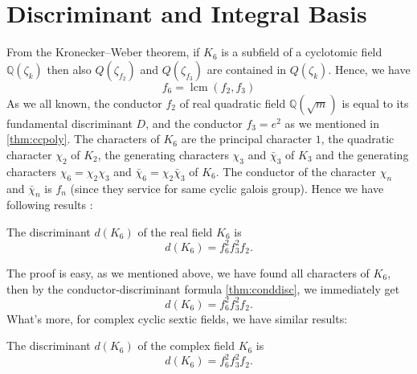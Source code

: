 \section{Discriminant and Integral Basis}
From the Kronecker–Weber theorem, if $K_6$ is a subfield of a cyclotomic field $\mathbb{Q}(\zeta_k)$ then also $Q(\zeta_{f_2})$ and $Q(\zeta_{f_3})$ are contained in $Q(\zeta_{k})$. Hence, we have
$$f_6=\operatorname{lcm}(f_2,f_3)$$
As we all known, the conductor $f_2$ of real quadratic field $\mathbb{Q}(\sqrt{m})$ is equal to its fundamental discriminant $D$, and the conductor $f_3=e^2$ as we mentioned in \ref{thm:ccpoly}.
The characters of $K_6$ \citep{maki1980determination} are the principal character $1$, the quadratic character $\chi_2$ of $K_2$, the generating characters $\chi_3$ and $\bar{\chi}_3$ of $K_3$ and the generating characters $\chi_6=\chi_2\chi_3$ and $\bar{\chi}_6=\chi_2\bar{\chi}_3$ of $K_6$. The conductor of the character $\chi_n$ and $\bar{\chi}_n$ is $f_n$ (since they service for same cyclic galois group). Hence we have following results \citep{hasse1952uber}:
\begin{theorem}\label{thm:sexdisc}
The discriminant $d(K_6)$ of the real field $K_6$ is $$d(K_6)=f_6^2f_3^2f_2.$$
\end{theorem}
The proof is easy, as we mentioned above, we have found all characters of $K_6$, then by the conductor-discriminant formula \ref{thm:conddisc}, we immediately get $$d(K_6)=f_6^2f_3^2f_2.$$ 
What's more, for complex cyclic sextic fields, we have similar results:
\begin{theorem}\label{thm:sexdisccom}
The discriminant $d(K_6)$ of the complex field $K_6$ is $$d(K_6)=f_6^2f_3^2f_2.$$
\end{theorem}

